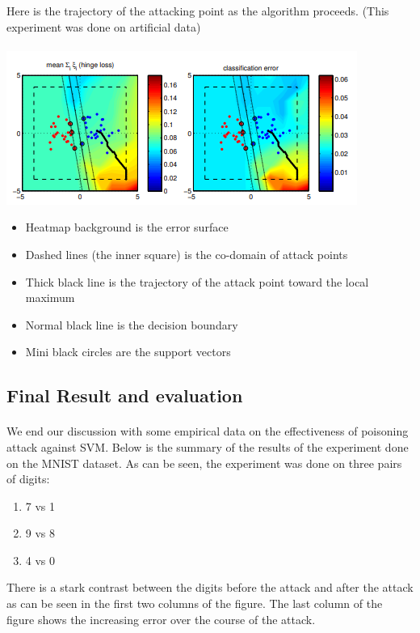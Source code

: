 \documentclass[twoside]{article}
\begin{document}
Here is the trajectory of the attacking point as the algorithm proceeds. (This experiment was done on artificial data)
\paragraph{}
\includegraphics[scale=1.4, inner]{poisontrajectory.PNG}
\begin{itemize}
  \item Heatmap background is the error surface
  \item Dashed lines (the inner square) is the co-domain of attack points
  \item Thick black line is the trajectory of the attack point toward the local maximum
  \item Normal black line is the decision boundary
  \item Mini black circles are the support vectors
\end{itemize}
\newpage
\subsection{Final Result and evaluation}
\paragraph{}
We end our discussion with some empirical data on the effectiveness of poisoning attack against SVM. Below is the summary of the results of the experiment done on the MNIST dataset. As can be seen, the experiment was done on three pairs of digits:
\begin{enumerate}
    \item 7 vs 1
    \item 9 vs 8
    \item 4 vs 0
\end{enumerate}
There is a stark contrast between the digits before the attack and after the attack as can be seen in the first two columns of the figure. The last column of the figure shows the increasing error over the course of the attack. 
\end{document}

